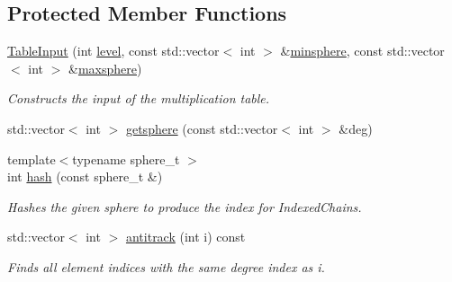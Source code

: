 \subsection*{Protected Member Functions}
\begin{DoxyCompactItemize}
\item 
\hyperlink{classMackey_1_1TableInput_ac2cad07d3e3188d9254d39affad86713}{Table\+Input} (int \hyperlink{classMackey_1_1TableInput_afa9c0057ffdcded31253a9f5dfbeaa2d}{level}, const std\+::vector$<$ int $>$ \&\hyperlink{classMackey_1_1TableInput_a3f4bf3973cebe4bc2d305d111fa8b478}{minsphere}, const std\+::vector$<$ int $>$ \&\hyperlink{classMackey_1_1TableInput_a56448ebdfecb95da4c52349d4ccbf576}{maxsphere})
\begin{DoxyCompactList}\small\item\em Constructs the input of the multiplication table. \end{DoxyCompactList}\item 
std\+::vector$<$ int $>$ \hyperlink{classMackey_1_1TableInput_ace924319da8b66c82214a49277f9e3d3}{getsphere} (const std\+::vector$<$ int $>$ \&deg)
\item 
{\footnotesize template$<$typename sphere\+\_\+t $>$ }\\int \hyperlink{classMackey_1_1TableInput_aff13b1ef901103816a6ed49bae688629}{hash} (const sphere\+\_\+t \&)
\begin{DoxyCompactList}\small\item\em Hashes the given sphere to produce the index for Indexed\+Chains. \end{DoxyCompactList}\item 
std\+::vector$<$ int $>$ \hyperlink{classMackey_1_1TableInput_ae52e7e3ab4605a6ec2d658671db8f896}{antitrack} (int i) const
\begin{DoxyCompactList}\small\item\em Finds all element indices with the same degree index as i. \end{DoxyCompactList}\end{DoxyCompactItemize}
